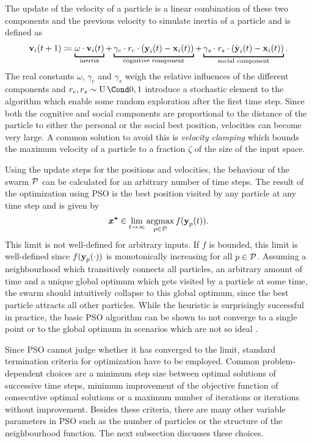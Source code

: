 The update of the velocity of a particle is a linear combination of these two components and the previous velocity to simulate inertia of a particle and is defined as
\begin{align}
    \label{eq:pso_velocity}
    \Vel_i(t+1) \coloneqq
        \underbracket[1pt]{\omega \cdot \Vel_i(t)}_{\text{inertia}}
        + \underbracket[1pt]{\gamma_c \cdot r_c \cdot \left( \Cog_i(t) - \Pos_i(t) \right)}_{\text{cognitive component}}
        + \underbracket[1pt]{\gamma_s \cdot r_s \cdot \left( \Soc_i(t) - \Pos_i(t) \right)}_{\text{social component}}.
\end{align}
The real constants $\omega$, $\gamma_c$ and $\gamma_s$ weigh the relative influences of the different components and $r_c, r_s \sim \Uniform{0, 1}$ introduce a stochastic element to the algorithm which enable some random exploration after the first time step.
Since both the cognitive and social components are proportional to the distance of the particle to either the personal or the social best position, velocities can become very large.
A common solution to avoid this is \emph{velocity clamping} which bounds the maximum velocity of a particle to a fraction $\zeta$ of the size of the input space.

Using the update steps for the positions and velocities, the behaviour of the swarm $\operatorname{\mathcal{P}}$ can be calculated for an arbitrary number of time steps.
The result of the optimization using PSO is the best position visited by any particle at any time step and is given by
\begin{align}
    \bm{x^\ast} \in \lim_{t \to \infty} \operatorname*{argmax}_{p \in \operatorname{\mathcal{P}}} f(\operatorname{\mathbf{y}}_p(t)).
\end{align}
This limit is not well-defined for arbitrary inputs.
If $f$ is bounded, this limit is well-defined since $f(\operatorname{\mathbf{y}}_p(\cdot))$ is monotonically increasing for all $p \in \operatorname{\mathcal{P}}$.
Assuming a neighbourhood which transitively connects all particles, an arbitrary amount of time and a unique global optimum which gets visited by a particle at some time, the swarm should intuitively collapse to this global optimum, since the best particle attracts all other particles.
While the heuristic is surprisingly successful in practice, the basic PSO algorithm can be shown to not converge to a single point or to the global optimum in scenarios which are not so ideal \cite{engelbrecht_fundamentals_2006}.

Since PSO cannot judge whether it has converged to the limit, standard termination criteria for optimization have to be employed.
Common problem-dependent choices are a minimum step size between optimal solutions of successive time steps, minimum improvement of the objective function of consecutive optimal solutions or a maximum number of iterations or iterations without improvement.
Besides these criteria, there are many other variable parameters in PSO such as the number of particles or the structure of the neighbourhood function.
The next subsection discusses these choices.

